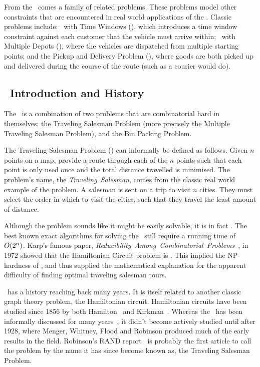 From the \VRP\ comes a family of related problems. These problems model other constraints that are encountered in real world applications of the \VRP. Classic problems include: \VRP\ with Time Windows (\VRPTW), which introduces a time window constraint against each customer that the vehicle must arrive within; \VRP\ with Multiple Depots (\MDVRP), where the vehicles are dispatched from multiple starting points; and the Pickup and Delivery Problem (\PDP), where goods are both picked up and delivered during the course of the route (such as a courier would do).

\subsection{\TSP\ Introduction and History}
\label{sec:tiah}

The \VRP\ is a combination of two problems that are combinatorial hard in themselves: the Traveling Salesman Problem (more precisely the Multiple Traveling Salesman Problem), and the Bin Packing Problem.

The Traveling Salesman Problem (\TSP) can informally be defined as follows. Given $n$ points on a map, provide a route through each of the $n$ points such that each point is only used once and the total distance travelled is minimised. The problem's name, the \emph{Traveling~Salesman}, comes from the classic real world example of the problem. A salesman is sent on a trip to visit $n$ cities. They must select the order in which to visit the cities, such that they travel the least amount of distance.

Although the problem sounds like it might be easily solvable, it is in fact \nphard. The best known exact algorithms for solving the \TSP\ still require a running time of $\mbox{$O(2^n)$}$. Karp's famous paper, \emph{Reducibility~Among~Combinatorial~Problems}~\cite{Kar72}, in 1972 showed that the Hamiltonian Circuit problem is \npcomplete. This implied the NP-hardness of \TSP, and thus supplied the mathematical explanation for the apparent difficulty of finding optimal traveling salesman tours. 


\TSP\ has a history reaching back many years. It is itself related to another classic graph theory problem, the Hamiltonian circuit. Hamiltonian circuits have been studied since 1856 by both Hamilton~\cite{Hamilton:1856} and Kirkman~\cite{Kirkman:1856}. Whereas the \TSP\ has been informally discussed for many years~\cite{Schrijver}, it didn't become actively studied until after 1928, where Menger, Whitney, Flood and Robinson produced much of the early results in the field. Robinson's RAND report~\cite{Robinson:1949} is probably the first article to call the problem by the name it has since become known as, the Traveling Salesman Problem. 

